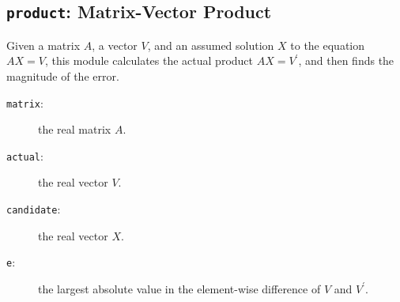 \subsection{{\tt{product}}: Matrix-Vector Product\label{s:toys-product}}

Given a matrix $A$,
a vector $V$,
and an assumed solution $X$ to the equation $AX=V$,
this module calculates the actual product $AX={V^{\prime}}$,
and then finds the magnitude of the error.

{}

\begin{description}
\item[{\tt{matrix}}:]
	the real matrix $A$.
\item[{\tt{actual}}:]
	the real vector $V$.
\item[{\tt{candidate}}:]
	the real vector $X$.
\end{description}

{\outputspec}

\begin{description}
\item[{\tt{e}}:]
	the largest absolute value in the element-wise difference of $V$ and $V^{\prime}$.
\end{description}
